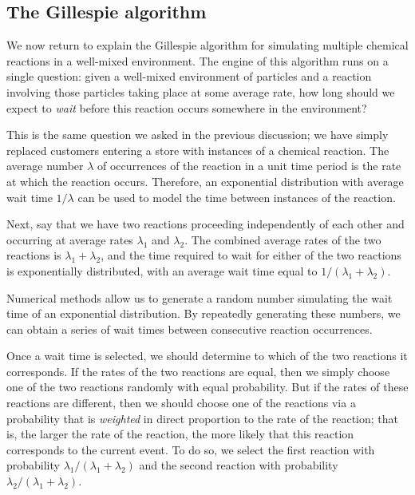 \begin{qbox}\end{qbox}

\FloatBarrier
{}
\subsection{The Gillespie algorithm}

We now return to explain the Gillespie algorithm for simulating multiple chemical reactions in a well-mixed environment. The engine of this algorithm runs on a single question: given a well-mixed environment of particles and a reaction involving those particles taking place at some average rate, how long should we expect to \textit{wait} before this reaction occurs somewhere in the environment?

This is the same question we asked in the previous discussion; we have simply replaced customers entering a store with instances of a chemical reaction. The average number $\lambda$ of occurrences of the reaction in a unit time period is the rate at which the reaction occurs. Therefore, an exponential distribution with average wait time $1/\lambda$ can be used to model the time between instances of the reaction.

Next, say that we have two reactions proceeding independently of each other and occurring at average rates $\lambda_1$ and $\lambda_2$. The combined average rates of the two reactions is $\lambda_1 + \lambda_2$, and the time required to wait for either of the two reactions is exponentially distributed, with an average wait time equal to $1/(\lambda_1 + \lambda_2)$.

Numerical methods allow us to generate a random number simulating the wait time of an exponential distribution. By repeatedly generating these numbers, we can obtain a series of wait times between consecutive reaction occurrences.

Once a wait time is selected, we should determine to which of the two reactions it corresponds. If the rates of the two reactions are equal, then we simply choose one of the two reactions randomly with equal probability. But if the rates of these reactions are different, then we should choose one of the reactions via a probability that is \textit{weighted} in direct proportion to the rate of the reaction; that is, the larger the rate of the reaction, the more likely that this reaction corresponds to the current event. To do so, we select the first reaction with probability $\lambda_1/(\lambda_1 + \lambda_2)$ and the second reaction with probability $\lambda_2/(\lambda_1 + \lambda_2)$.\\

